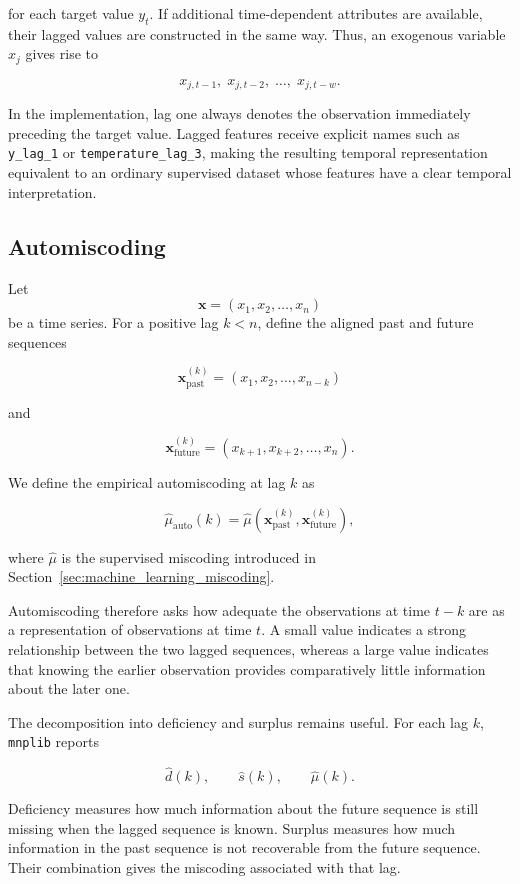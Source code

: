 for each target value \(y_t\). If additional time-dependent attributes are
available, their lagged values are constructed in the same way. Thus, an
exogenous variable \(x_j\) gives rise to

\[
x_{j,t-1},\;
x_{j,t-2},\;
\ldots,\;
x_{j,t-w}.
\]

In the implementation, lag one always denotes the observation immediately
preceding the target value. Lagged features receive explicit names such as
\texttt{y\_lag\_1} or \texttt{temperature\_lag\_3}, making the resulting
temporal representation equivalent to an ordinary supervised dataset whose
features have a clear temporal interpretation.

\subsection*{Automiscoding}

Let
\[
\mathbf{x}
=
(x_1,x_2,\ldots,x_n)
\]
be a time series. For a positive lag \(k<n\), define the aligned past and
future sequences

\[
\mathbf{x}^{(k)}_{\mathrm{past}}
=
(x_1,x_2,\ldots,x_{n-k})
\]

and

\[
\mathbf{x}^{(k)}_{\mathrm{future}}
=
(x_{k+1},x_{k+2},\ldots,x_n).
\]

We define the empirical automiscoding at lag \(k\) as

\[
\widehat\mu_{\mathrm{auto}}(k)
=
\widehat\mu
\left(
\mathbf{x}^{(k)}_{\mathrm{past}},
\mathbf{x}^{(k)}_{\mathrm{future}}
\right),
\]

where \(\widehat\mu\) is the supervised miscoding introduced in
Section~\ref{sec:machine_learning_miscoding}.

Automiscoding therefore asks how adequate the observations at time \(t-k\) are
as a representation of observations at time \(t\). A small value indicates a
strong relationship between the two lagged sequences, whereas a large value
indicates that knowing the earlier observation provides comparatively little
information about the later one.

The decomposition into deficiency and surplus remains useful. For each lag
\(k\), \texttt{mnplib} reports

\[
\widehat d(k),
\qquad
\widehat s(k),
\qquad
\widehat\mu(k).
\]

Deficiency measures how much information about the future sequence is still
missing when the lagged sequence is known. Surplus measures how much
information in the past sequence is not recoverable from the future sequence.
Their combination gives the miscoding associated with that lag.

